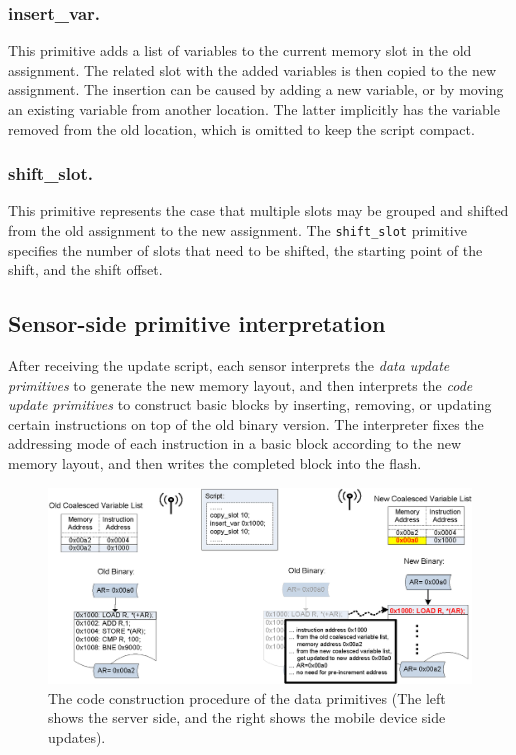 \subsubsection{insert\_var.} This primitive adds a list of variables to the current memory slot in the old assignment. The related slot with the added variables is then copied to the new assignment. The insertion can be caused by adding a new variable, or by moving an existing variable from another location. The latter implicitly has the variable removed from the old location, which is omitted to keep the script compact. 

\subsubsection{shift\_slot.} This primitive represents the case that multiple slots may be grouped and shifted from the old assignment to the new assignment. The {\tt shift\_slot} primitive specifies the number of slots that need to be shifted, the starting point of the shift, and the shift offset.


\subsection{Sensor-side primitive interpretation}

After receiving the update script, each sensor interprets the {\em data update primitives} to generate the new memory layout, and then interprets the {\em code update primitives} to construct basic blocks by inserting, removing, or updating certain instructions on top of the old binary version. The interpreter fixes the addressing mode of each instruction in a basic block according to the new memory layout, and then writes the completed block into the flash.


\begin{figure}[htbp]
\begin{center}
\includegraphics[width=6in]{./figures/correct.eps}
\caption{The code construction procedure of the data primitives (The left shows the server side, and the right shows the mobile device side updates).}
\label{codecorrection}
\end{center}
\end{figure}

